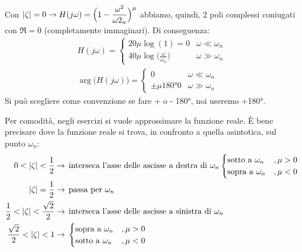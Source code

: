	Con $ \displaystyle \lvert\zeta\rvert = 0 \rightarrow H(j\omega) = \Big(1-\frac{\omega^2}{\omega2_n}\Big)^\mu $ abbiamo, quindi, 2 poli complessi coniugati con $ \Re =0 $ (completamente immaginari). Di conseguenza:
	\begin{gather*}
		H(j\omega)=
		\begin{cases}
			20\mu \log(1)=0 &\omega \ll \omega_n\\
			40\mu\log\big(\frac{\omega}{\omega_n}\big) &\omega \gg \omega_n
		\end{cases}\\
		\arg \big(H(j\omega)\big) = 
		\begin{cases}
			0 &\omega \ll \omega_n\\
			\pm \mu \ang{180} 0 &\omega \gg \omega_n
		\end{cases}
	\end{gather*}
Si può scegliere come convenzione se fare + o - \ang{180}, noi useremo +\ang{180}.

Per comodità, negli esercizi si vuole approssimare la funzione reale. È bene precisare dove la funzione reale si trova, in confronto a quella asintotica, sul punto $ \omega_n $:
\begin{align*}
	0<\lvert\zeta\rvert<\frac{1}{2} &\rightarrow \, \text{interseca l'asse delle ascisse a destra di $ \omega_n $}
		\begin{cases}
			\text{sotto a }\omega_n &,\mu >0\\
			\text{sopra a }\omega_n &,\mu <0
		\end{cases}\\
	\lvert\zeta\rvert =\frac{1}{2} &\rightarrow\, \text{passa per $ \omega_n $}\\
	\frac{1}{2}<\lvert\zeta\rvert<\frac{\sqrt{2}}{2} &\rightarrow \, \text{interseca l'asse delle ascisse a sinistra di $ \omega_n $}\\
	\frac{\sqrt{2}}{2}<\lvert\zeta\rvert<1 &\rightarrow \,
		\begin{cases}
			\text{sopra a }\omega_n &,\mu >0\\
			\text{sotto a }\omega_n &,\mu <0
		\end{cases}
\end{align*}



